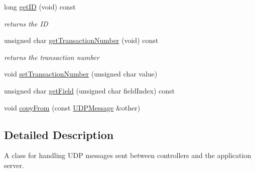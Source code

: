 \begin{DoxyCompactItemize}
\mbox{\label{class_u_d_p_message_add45e9751d72e7d789ed6dcdb06c23d2}} 
long \hyperlink{class_u_d_p_message_add45e9751d72e7d789ed6dcdb06c23d2}{get\+ID} (void) const
\begin{DoxyCompactList}\small\item\em returns the ID \end{DoxyCompactList}\item 
\mbox{\label{class_u_d_p_message_a65fed9ee9c6dc936e1c9d1ae3052d1f7}} 
unsigned char \hyperlink{class_u_d_p_message_a65fed9ee9c6dc936e1c9d1ae3052d1f7}{get\+Transaction\+Number} (void) const
\begin{DoxyCompactList}\small\item\em returns the transaction number \end{DoxyCompactList}\item 
void \hyperlink{class_u_d_p_message_a27629d5cab43160d53cedfd894e1c216}{set\+Transaction\+Number} (unsigned char value)
\item 
unsigned char \hyperlink{class_u_d_p_message_a869585e0916d3b9edf99111f8fc74709}{get\+Field} (unsigned char field\+Index) const
\item 
void \hyperlink{class_u_d_p_message_a313c116a2f7f0f134745ed0c4a759733}{copy\+From} (const \hyperlink{class_u_d_p_message}{U\+D\+P\+Message} \&other)
\end{DoxyCompactItemize}


\subsection{Detailed Description}
A class for handling U\+DP messages sent between controllers and the application server. 

